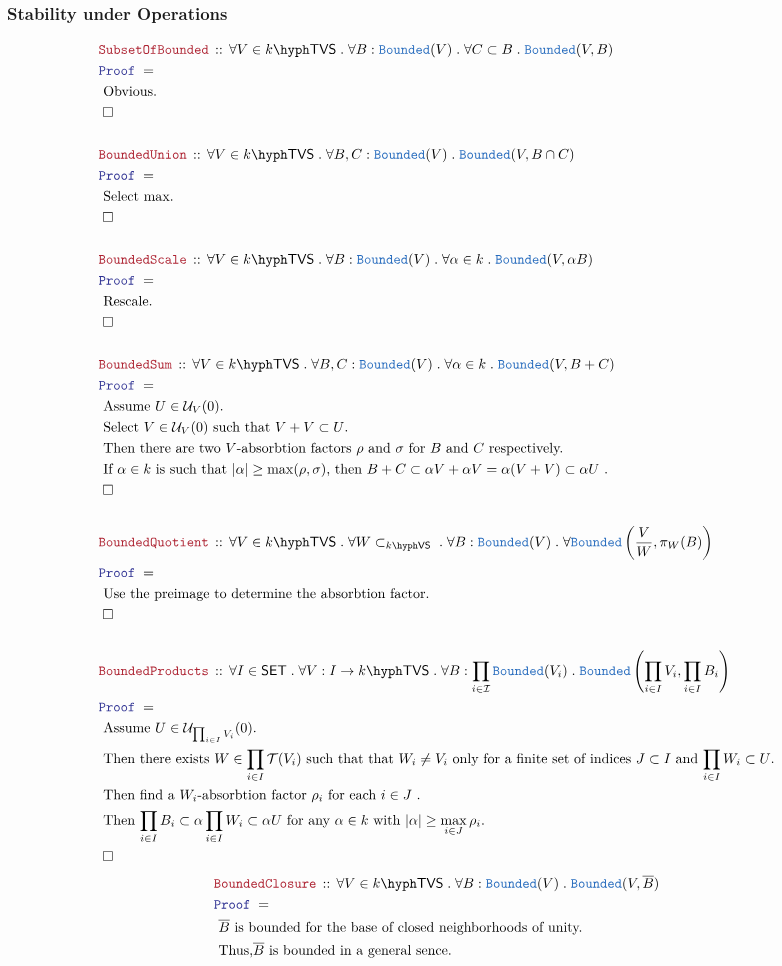 \documentclass[12pt]{scrartcl}
\newcommand{\TYPE}[1]{\textcolor{NavyBlue}{\mathtt{#1}}}
\newcommand{\LOGIC}[1]{\textcolor{Blue}{\mathtt{#1}}}
\newcommand{\THM}[1]{\textcolor{Maroon}{\mathtt{#1}}}
\renewcommand{\.}{\; . \;}
\newcommand{\Theorem}[2]{& \THM{#1} \, :: \, #2 \\ & \Proof = \\ }
\newcommand{\Page}[1]{ \begin{align*} #1 \end{align*}   }
\newcommand{\Explain}[1]{& \text{#1.} \\}
\newcommand{\QED}{\; \square}
\newcommand{\EndProof}{& \QED \\}
\newcommand{\Proof}{\LOGIC{Proof} \; }
\newcommand{\I}{\mathcal{I}}
\newcommand{\SET}{\mathsf{SET}}
\newcommand{\T}{\mathcal{T}}
\renewcommand{\U}{\mathcal{U}}
\newcommand{\Bounded}{\TYPE{Bounded}}
\newcommand{\subvec}[1]{\subset_{\VS{#1}}}%
\newcommand{\VS}[1]{#1\hyph\mathsf{VS}} %
\newcommand{\TVS}[1]{{#1}\hyph\mathsf{TVS}}
\begin{document}
\subsubsection{Stability under Operations}
\Page{
	\Theorem{SubsetOfBounded}
	{
		\forall V \in \TVS{k} \.
		\forall B : \Bounded(V) \.
		\forall C \subset B \.
		\Bounded(V,B)
	}
	\Explain{ Obvious}
	\EndProof
	\\
	\Theorem{BoundedUnion}
	{
		\forall V \in \TVS{k} \.
		\forall B,C : \Bounded(V) \.
		\Bounded(V,B \cap C)
	}
	\Explain{ Select max}
	\EndProof
	\\
	\Theorem{BoundedScale}
	{
		\forall V \in \TVS{k} \.
		\forall B : \Bounded(V) \.
		\forall \alpha \in k \.		
		\Bounded(V, \alpha B)
	}
	\Explain{ Rescale}
	\EndProof
	\\
	\Theorem{BoundedSum}
	{
		\forall V \in \TVS{k} \.
		\forall B,C : \Bounded(V) \.
		\forall \alpha \in k \.		
		\Bounded(V, B + C)
	}
	\Explain{ Assume $U \in \U_V(0)$}
	\Explain{ Select $V \in \U_V(0)$ such that $V + V \subset U$}
	\Explain{ Then there are two $V$-absorbtion factors $\rho$ and $\sigma$ for $B$ and $C$  
		respectively}
	\Explain{
		If $\alpha \in k$ is such that $|\alpha| \ge \max(\rho,\sigma)$, then
		$  B + C \subset \alpha V + \alpha V = \alpha(V + V) \subset \alpha U$ 
	}
	\EndProof
	\\
	\Theorem{BoundedQuotient}
	{
		\forall V \in \TVS{k} \.
		\forall W\subvec{k} \.
		\forall B : \Bounded(V)\.
		\forall \Bounded\left( \frac{V}{W}, \pi_W(B) \right)
	}
	\Explain{ Use the preimage to determine the absorbtion factor}
	\EndProof
	\\
	\Theorem{BoundedProducts}
	{
		\forall I \in \SET \.		
		\forall V : I \to \TVS{k} \.
		\forall B : \prod_{i \in \I} \Bounded(V_i) \.
		\Bounded\left(\prod_{i\in I} V_i, \prod_{i \in I} B_i \right)
	}
	\Explain{ Assume $U \in \U_{\prod_{i \in I} V_i}(0)$}
	\Explain{ Then there exists $W \in \prod_{i \in I} \T(V_i)$  
		such that that $W_i \neq V_i$ only for a finite set of indices $J \subset I$ 
		and $\prod_{i \in I} W_i \subset U$}
	\Explain{
		Then find a $W_i$-absorbtion factor $\rho_i$ for each $i \in J$ 
	}
	\Explain{ Then $\prod_{i \in I} B_i \subset \alpha \prod_{i \in I} W_i \subset \alpha U$ 
		for any $\alpha \in k$ with $|\alpha| \ge \max_{i \in J} \rho_i$}
	\EndProof
}\Page{
	\Theorem{BoundedClosure}
	{
		\forall V \in \TVS{k} \.
		\forall B : \Bounded(V) \.
		\Bounded(V,\overline B)
	}
	\Explain{ $\overline B$ is bounded for the base of closed neighborhoods of unity}
	\Explain{ Thus,$ \overline B$ is bounded in a general sence}
}
\end{document}
